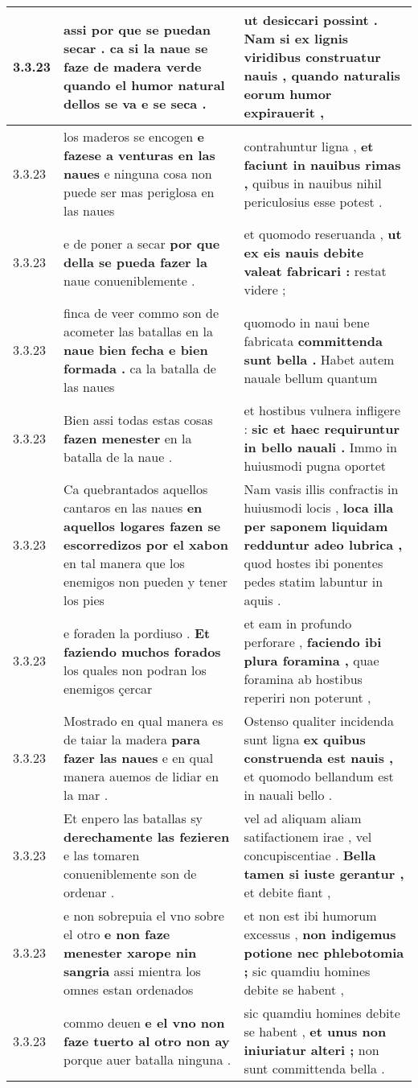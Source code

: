 \begin{tabular}{|p{1cm}|p{6.5cm}|p{6.5cm}|}
3.3.23 & assi por que se puedan secar . \textbf{ ca si la naue se faze de madera verde } quando el humor natural dellos se va e se seca . & ut desiccari possint . \textbf{ Nam si ex lignis viridibus construatur nauis , } quando naturalis eorum humor expirauerit , \\\hline
3.3.23 & los maderos se encogen \textbf{ e fazese a venturas en las naues } e ninguna cosa non puede ser mas periglosa en las naues & contrahuntur ligna , \textbf{ et faciunt in nauibus rimas , } quibus in nauibus nihil periculosius esse potest . \\\hline
3.3.23 & e de poner a secar \textbf{ por que della se pueda fazer la } naue conueniblemente . & et quomodo reseruanda , \textbf{ ut ex eis nauis debite valeat fabricari : } restat videre ; \\\hline
3.3.23 & finca de veer commo son de acometer las batallas en la \textbf{ naue bien fecha e bien formada . } ca la batalla de las naues & quomodo in naui bene fabricata \textbf{ committenda sunt bella . } Habet autem nauale bellum quantum \\\hline
3.3.23 & Bien assi todas estas cosas \textbf{ fazen menester } en la batalla de la naue . & et hostibus vulnera infligere : \textbf{ sic et haec requiruntur in bello nauali . } Immo in huiusmodi pugna oportet \\\hline
3.3.23 & Ca quebrantados aquellos cantaros en las naues \textbf{ en aquellos logares fazen se escorredizos por el xabon } en tal manera que los enemigos non pueden y tener los pies & Nam vasis illis confractis in huiusmodi locis , \textbf{ loca illa per saponem liquidam redduntur adeo lubrica , } quod hostes ibi ponentes pedes statim labuntur in aquis . \\\hline
3.3.23 & e foraden la pordiuso . \textbf{ Et faziendo muchos forados } los quales non podran los enemigos çercar & et eam in profundo perforare , \textbf{ faciendo ibi plura foramina , } quae foramina ab hostibus reperiri non poterunt , \\\hline
3.3.23 & Mostrado en qual manera es de taiar la madera \textbf{ para fazer las naues } e en qual manera auemos de lidiar en la mar . & Ostenso qualiter incidenda sunt ligna \textbf{ ex quibus construenda est nauis , } et quomodo bellandum est in nauali bello . \\\hline
3.3.23 & Et enpero las batallas sy \textbf{ derechamente las fezieren } e las tomaren conueniblemente son de ordenar . & vel ad aliquam aliam satifactionem irae , vel concupiscentiae . \textbf{ Bella tamen si iuste gerantur , } et debite fiant , \\\hline
3.3.23 & e non sobrepuia el vno sobre el otro \textbf{ e non faze menester xarope nin sangria } assi mientra los omnes estan ordenados & et non est ibi humorum excessus , \textbf{ non indigemus potione nec phlebotomia ; } sic quamdiu homines debite se habent , \\\hline
3.3.23 & commo deuen \textbf{ e el vno non faze tuerto al otro non ay } porque auer batalla ninguna . & sic quamdiu homines debite se habent , \textbf{ et unus non iniuriatur alteri ; } non sunt committenda bella . \\\hline

\end{tabular}
